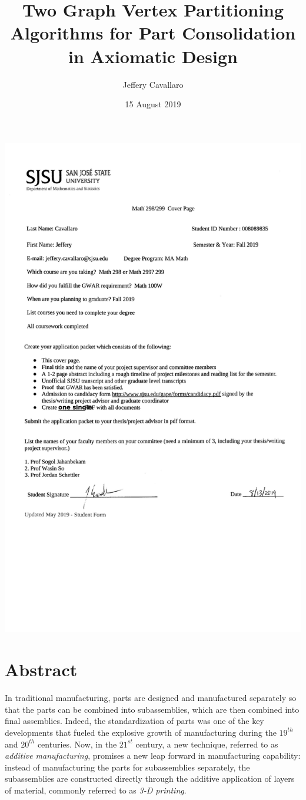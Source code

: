 \documentclass[letterpaper,12pt]{article}
\begin{document}
\hspace*{-1in}
\includegraphics[scale=0.9]{CoverPage.jpg}

\title{Two Graph Vertex Partitioning Algorithms for Part Consolidation in Axiomatic Design}
\author{Jeffery Cavallaro}
\date{15 August 2019}
\maketitle
\section*{Abstract}
In traditional manufacturing, parts are designed and manufactured separately so that the parts can be combined into
subassemblies, which are then combined into final assemblies.  Indeed, the standardization of parts was one of the
key developments that fueled the explosive growth of manufacturing during the \(19^{th}\) and \(20^{th}\)
centuries.  Now, in the \(21^{st}\) century, a new technique, referred to as \emph{additive manufacturing},
promises a new leap forward in manufacturing capability: instead of manufacturing the parts for subassemblies
separately, the subassemblies are constructed directly through the additive application of layers of material,
commonly referred to as \emph{3-D printing}.
\end{document}
